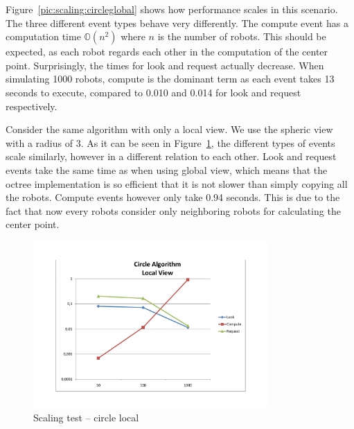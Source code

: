 Figure~\ref{pic:scaling:circleglobal} shows how performance scales in this scenario. The three different event types behave very differently. The compute event has a computation time $\mathbb{O}(n^2)$ where $n$ is the number of robots. This should be expected, as each robot regards each other in the computation of the center point. Surprisingly, the times for look and request actually decrease. When simulating 1000 robots, compute is the dominant term as each event takes 13 seconds to execute, compared to 0.010 and 0.014 for look and request respectively.

Consider the same algorithm with only a local view. We use the spheric view with a radius of 3. As it can be seen in Figure~\ref{pic:scaling:circlelocal}, the different types of events scale similarly, however in a different relation to each other. Look and request events take the same time as when using global view, which means that the octree implementation is so efficient that it is not slower than simply copying all the robots. Compute events however only take 0.94 seconds. This is due to the fact that now every robots consider only neighboring robots for calculating the center point.

\begin{figure}[p]
	\begin{center}
	\includegraphics[width=0.8\textwidth]{scaling-circle-local}
	\caption{Scaling test -- circle local}
	\label{pic:scaling:circlelocal}
	\end{center}
\end{figure}

